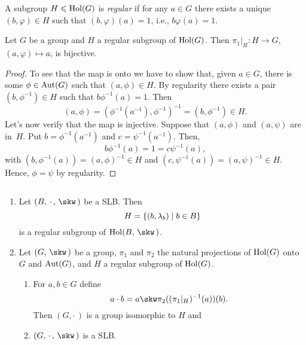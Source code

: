 \begin{defn}
    A subgroup $H\leqslant\operatorname{Hol}(G)$ is \textsl{regular} if for any $a\in G$ there exists a unique $(b,\varphi)\in H$ such that $(b,\varphi)(a)=1$, i.e., $b\varphi(a)=1$.
\end{defn}

\begin{lem}\label{lem:bijective-pi_1|_H}
    Let\/ $G$ be a group and\/ $H$ a regular subgroup of\/ $\operatorname{Hol}(G)$. Then\/ $\pi_1|_H : H \to G$, $(a,\varphi) \mapsto a$, is bijective.
\end{lem}

\begin{proof}
    To see that the map is onto we have to show that, given $a\in G$, there is some $\phi\in{\rm Aut}(G)$ such that $(a,\phi)\in H$. By regularity there exists a pair $(b,\phi^{-1})\in H$ such that $b\phi^{-1}(a)=1$. Then
    $$
        (a,\phi)=(\phi^{-1}(a^{-1}),\phi^{-1})^{-1}
            =(b,\phi^{-1})\in H.
    $$
    Let's now verify that the map is injective. Suppose that $(a,\phi)$ and $(a,\psi)$ are in~$H$. Put $b=\phi^{-1}(a^{-1})$ and $c=\psi^{-1}(a^{-1})$. Then,
    $$
        b\phi^{-1}(a) = 1 = c\psi^{-1}(a),
    $$
    with $(b,\phi^{-1}(a))=(a,\phi)^{-1}\in H$ and $(c,\psi^{-1}(a))=(a,\psi)^{-1}\in H$. Hence, $\phi=\psi$ by regularity.
\end{proof}

\begin{thm}\label{thm:SLB-regular-equivalence}${}$
    \begin{enumerate}[\rm a)]
        \item Let\/ $(B,\,\cdot\,,\,\skw\,)$ be a SLB. Then
        $$
            H=\{(b,\lambda_b)\mid b\in B\}
        $$
        is a regular subgroup of\/ $\Hol(B,\,\skw\,)$.

        \item Let\/ $(G,\,\skw\,)$ be a group, $\pi_1$ and\/ $\pi_2$ the natural projections of\/ $\operatorname{Hol}(G)$\/ onto\/ $G$ and\/ ${\rm Aut}(G)$, and\/ $H$ a regular subgroup of\/ $\operatorname{Hol}(G)$. 
        \begin{enumerate}[\rm i)]
            \item For $a,b\in G$ define
            $$
                a\cdot b = a\skw\pi_2((\pi_1|_H)^{-1}(a))(b).
            $$
            Then $(G,\cdot\,)$ is a group isomorphic to\/ $H$ and
            \item $(G,\,\cdot\,,\,\skw\,)$ is a SLB.
        \end{enumerate}
    \end{enumerate}
\end{thm}

